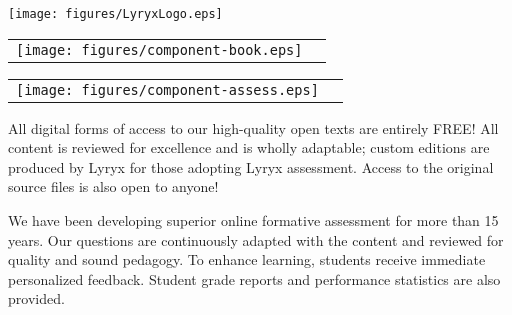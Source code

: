 \setlength{\parskip}{0pt}
\thispagestyle{empty}


\vspace{-3em}
\begin{center}
	\texttt{[image: figures/LyryxLogo.eps]}

	\vspace{2em}
	\textcolor{lscstextcolour}{\textbf{\fontsize{24}{28}\selectfont {Champions of Access to Knowledge}}}
\end{center}

\vfill

\begin{multicols}{2}
\begin{center}
\begin{lscshdrbox}
\begin{tabu}{X[1,c,m] X[2,l,m]}
\vspace{0pt}
\texttt{[image: figures/component-book.eps]}
&
\vspace{0pt}
\textcolor{white}{\textbf{\fontsize{14}{20}\selectfont {OPEN TEXT}}}
\end{tabu}
\end{lscshdrbox}
\end{center}

\columnbreak

\begin{center}
\begin{lscshdrbox}
\begin{tabu}{X[1,c,m] X[2,l,m]}
\vspace{0pt}
\texttt{[image: figures/component-assess.eps]}
&
\vspace{0pt}
\textcolor{white}{\textbf{\fontsize{14}{20}\selectfont {ONLINE ASSESSMENT}}}
\end{tabu}
\end{lscshdrbox}
\end{center}
\end{multicols}

\begin{center}
\begin{multicols}{2}
\parbox{0.9\linewidth}{
All digital forms of access to our high-quality open texts are entirely FREE! All content is reviewed for excellence and is wholly adaptable; custom editions are produced by Lyryx for those adopting Lyryx assessment. Access to the original source files is also open to anyone! 
}

\columnbreak

\parbox{0.9\linewidth}{
We have been developing superior online formative assessment for more than 15 years. Our questions are continuously adapted with the content and reviewed for quality and sound pedagogy. To enhance learning, students receive immediate personalized feedback. Student grade reports and performance statistics are also provided.
	}
\end{multicols}
\end{center}

